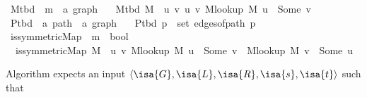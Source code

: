 \begin{isabellebody}
\isanewline
{}\isamarkupfalse%
\ M{\isacharunderscore}{\kern0pt}tbd\ {\isacharcolon}{\kern0pt}{\isacharcolon}{\kern0pt}\ {\isachardoublequoteopen}{\isacharprime}{\kern0pt}m\ {\isasymRightarrow}\ {\isacharprime}{\kern0pt}a\ graph{\isachardoublequoteclose}\ \isanewline
\ \ {\isachardoublequoteopen}M{\isacharunderscore}{\kern0pt}tbd\ M\ {\isasymequiv}\ {\isacharbraceleft}{\kern0pt}{\isacharbraceleft}{\kern0pt}u{\isacharcomma}{\kern0pt}\ v{\isacharbraceright}{\kern0pt}\ {\isacharbar}{\kern0pt}u\ v{\isachardot}{\kern0pt}\ M{\isacharunderscore}{\kern0pt}lookup\ M\ u\ {\isacharequal}{\kern0pt}\ Some\ v{\isacharbraceright}{\kern0pt}{\isachardoublequoteclose}\isanewline
\isanewline
\isanewline
{}\isamarkupfalse%
\ P{\isacharunderscore}{\kern0pt}tbd\ {\isacharcolon}{\kern0pt}{\isacharcolon}{\kern0pt}\ {\isachardoublequoteopen}{\isacharprime}{\kern0pt}a\ path\ {\isasymRightarrow}\ {\isacharprime}{\kern0pt}a\ graph{\isachardoublequoteclose}\ \isanewline
\ \ {\isachardoublequoteopen}P{\isacharunderscore}{\kern0pt}tbd\ p\ {\isasymequiv}\ set\ {\isacharparenleft}{\kern0pt}edges{\isacharunderscore}{\kern0pt}of{\isacharunderscore}{\kern0pt}path\ p{\isacharparenright}{\kern0pt}{\isachardoublequoteclose}\isanewline
\isanewline
{}\isamarkupfalse%
\ is{\isacharunderscore}{\kern0pt}symmetric{\isacharunderscore}{\kern0pt}Map\ {\isacharcolon}{\kern0pt}{\isacharcolon}{\kern0pt}\ {\isachardoublequoteopen}{\isacharprime}{\kern0pt}m\ {\isasymRightarrow}\ bool{\isachardoublequoteclose}\ \isanewline
\ \ {\isachardoublequoteopen}is{\isacharunderscore}{\kern0pt}symmetric{\isacharunderscore}{\kern0pt}Map\ M\ {\isasymequiv}\ {\isasymforall}u\ v{\isachardot}{\kern0pt}\ M{\isacharunderscore}{\kern0pt}lookup\ M\ u\ {\isacharequal}{\kern0pt}\ Some\ v\ {\isasymlongleftrightarrow}\ M{\isacharunderscore}{\kern0pt}lookup\ M\ v\ {\isacharequal}{\kern0pt}\ Some\ u{\isachardoublequoteclose}\isanewline
\isanewline
{}\isamarkupfalse%
%
\isadelimdocument
%
\endisadelimdocument
%
\isatagdocument
%
\isamarkuptrue%
%
\isamarkuptrue%
%
\endisatagdocument
{\isafolddocument}%
%
\isadelimdocument
%
\endisadelimdocument
%
\begin{isamarkuptext}%
Algorithm  expects an input $\langle \isa{G},\isa{L},\isa{R},
\isa{s},\isa{t}\rangle$ such that


\end{isamarkuptext}
\end{isabellebody}
